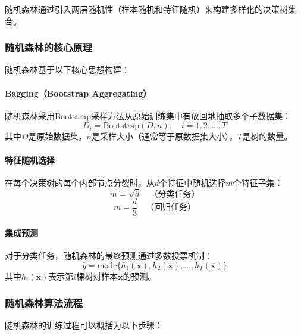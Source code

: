 \documentclass[UTF8]{report}
\theoremstyle{MyLineTheoremStyle} %
\theoremstyle{MyBlockTheoremStyle} %
\theoremstyle{MySubsubsectionStyle} %
\begin{document}
随机森林通过引入两层随机性（样本随机和特征随机）来构建多样化的决策树集合。

\subsubsection{随机森林的核心原理}

随机森林基于以下核心思想构建：

\paragraph{Bagging（Bootstrap Aggregating）}
随机森林采用Bootstrap采样方法从原始训练集中有放回地抽取多个子数据集：
\begin{equation}
D_i = \text{Bootstrap}(D, n), \quad i = 1, 2, \ldots, T
\end{equation}
其中$D$是原始数据集，$n$是采样大小（通常等于原数据集大小），$T$是树的数量。

\paragraph{特征随机选择}
在每个决策树的每个内部节点分裂时，从$d$个特征中随机选择$m$个特征子集：
\begin{equation}
m = \sqrt{d} \quad \text{（分类任务）}
\end{equation}
\begin{equation}
m = \frac{d}{3} \quad \text{（回归任务）}
\end{equation}

\paragraph{集成预测}
对于分类任务，随机森林的最终预测通过多数投票机制：
\begin{equation}
\hat{y} = \text{mode}\{h_1(\mathbf{x}), h_2(\mathbf{x}), \ldots, h_T(\mathbf{x})\}
\end{equation}
其中$h_i(\mathbf{x})$表示第$i$棵树对样本$\mathbf{x}$的预测。

\subsubsection{随机森林算法流程}

随机森林的训练过程可以概括为以下步骤：
\end{document}
